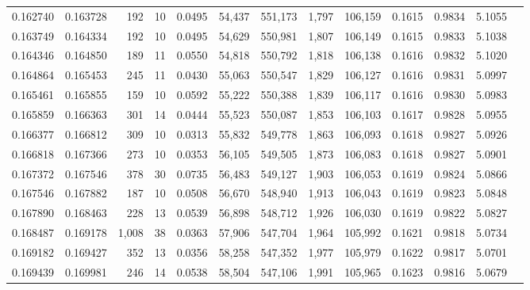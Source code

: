 \begin{tabular}{rrrrrrrrrrrrr}
0.162740 & 0.163728 &   192 &  10 &                                     0.0495 &  54,437 & 551,173 &   1,797 & 106,159 & 0.1615 & 0.9834 & 5.1055 \\
0.163749 & 0.164334 &   192 &  10 &                                     0.0495 &  54,629 & 550,981 &   1,807 & 106,149 & 0.1615 & 0.9833 & 5.1038 \\
0.164346 & 0.164850 &   189 &  11 &                                     0.0550 &  54,818 & 550,792 &   1,818 & 106,138 & 0.1616 & 0.9832 & 5.1020 \\
0.164864 & 0.165453 &   245 &  11 &                                     0.0430 &  55,063 & 550,547 &   1,829 & 106,127 & 0.1616 & 0.9831 & 5.0997 \\
0.165461 & 0.165855 &   159 &  10 &                                     0.0592 &  55,222 & 550,388 &   1,839 & 106,117 & 0.1616 & 0.9830 & 5.0983 \\
0.165859 & 0.166363 &   301 &  14 &                                     0.0444 &  55,523 & 550,087 &   1,853 & 106,103 & 0.1617 & 0.9828 & 5.0955 \\
0.166377 & 0.166812 &   309 &  10 &                                     0.0313 &  55,832 & 549,778 &   1,863 & 106,093 & 0.1618 & 0.9827 & 5.0926 \\
0.166818 & 0.167366 &   273 &  10 &                                     0.0353 &  56,105 & 549,505 &   1,873 & 106,083 & 0.1618 & 0.9827 & 5.0901 \\
0.167372 & 0.167546 &   378 &  30 &                                     0.0735 &  56,483 & 549,127 &   1,903 & 106,053 & 0.1619 & 0.9824 & 5.0866 \\
0.167546 & 0.167882 &   187 &  10 &                                     0.0508 &  56,670 & 548,940 &   1,913 & 106,043 & 0.1619 & 0.9823 & 5.0848 \\
0.167890 & 0.168463 &   228 &  13 &                                     0.0539 &  56,898 & 548,712 &   1,926 & 106,030 & 0.1619 & 0.9822 & 5.0827 \\
0.168487 & 0.169178 & 1,008 &  38 &                                     0.0363 &  57,906 & 547,704 &   1,964 & 105,992 & 0.1621 & 0.9818 & 5.0734 \\
0.169182 & 0.169427 &   352 &  13 &                                     0.0356 &  58,258 & 547,352 &   1,977 & 105,979 & 0.1622 & 0.9817 & 5.0701 \\
0.169439 & 0.169981 &   246 &  14 &                                     0.0538 &  58,504 & 547,106 &   1,991 & 105,965 & 0.1623 & 0.9816 & 5.0679 \\

\end{tabular}
